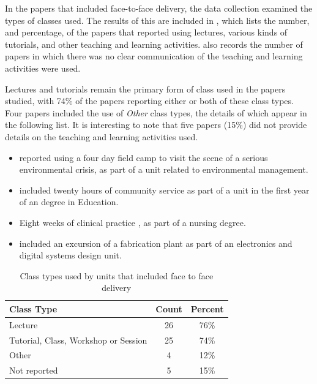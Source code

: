 In the papers that included face-to-face delivery, the data collection examined the types of classes used. The results of this are included in , which lists the number, and percentage, of the papers that reported using lectures, various kinds of tutorials, and other teaching and learning activities.  also records the number of papers in which there was no clear communication of the teaching and learning activities were used.

Lectures and tutorials remain the primary form of class used in the papers studied, with 74\% of the papers reporting either or both of these class types. Four papers included the use of \emph{Other} class types, the details of which appear in the following list. It is interesting to note that five papers (15\%) did not provide details on the teaching and learning activities used.

\begin{itemize}[noitemsep,nolistsep]
	\item \citet{Szili:2011} reported using a four day field camp to visit the scene of a serious environmental crisis, as part of a unit related to environmental management.
	\item \citet{donnisonre} included twenty hours of community service as part of a unit in the first year of an degree in Education.
	\item Eight weeks of clinical practice \citet{Tang:1999}, as part of a nursing degree.
	\item \citet{Shoufan:2010:CRP:1789934.1789937} included an excursion of a fabrication plant as part of an electronics and digital systems design unit. %
\end{itemize}

\begin{table}[htbp]
	\centering
	\caption{Class types used by units that included face to face delivery}
	\label{tbl:class_types}
	\footnotesize
    \begin{tabular}{l|c|c}
    \textbf{Class Type} & \textbf{Count} & \textbf{Percent} \\ \hline
    Lecture & 26 & 76\% \\
    Tutorial, Class, Workshop or Session & 25 & 74\% \\
    Other & 4 & 12\% \\
    Not reported & 5 & 15\% \\
    \end{tabular}
\end{table}

